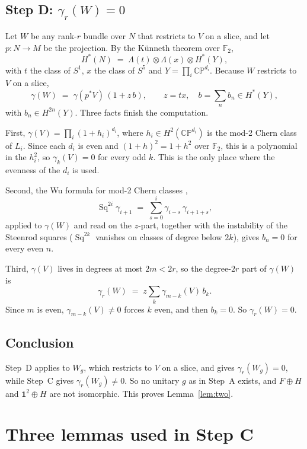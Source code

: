 \documentclass[11pt]{amsart}
\newcommand{\leanverified}[2]{\ignorespaces}
\theoremstyle{plain}
\theoremstyle{definition}
\newcommand{\F}{\mathbb F}
\newcommand{\CP}{\mathbb{CP}}
\newcommand{\Sq}{\operatorname{Sq}}
\begin{document}
\subsection{Step D: $\gamma_r(W) = 0$}

Let $W$ be any rank-$r$ bundle over $N$ that restricts to $V$ on a slice, and
let $p \colon N \to M$ be the projection.  By the K\"unneth theorem over
$\F_2$,
\[
  H^{*}(N) \;=\; \Lambda(t) \otimes \Lambda(x) \otimes H^{*}(Y),
\]
with $t$ the class of $S^1$, $x$ the class of $S^5$ and
$Y = \prod_i \CP^{d_i}$.  Because $W$ restricts to $V$ on a slice,
\[
  \gamma(W) \;=\; \gamma(p^{*}V)\,(1 + z\,b),
  \qquad z = t x,\quad b = \sum_n b_n \in H^{*}(Y),
\]
with $b_n \in H^{2n}(Y)$.  Three facts finish the computation.

First, $\gamma(V) = \prod_i (1+h_i)^{d_i}$, where $h_i \in H^2(\CP^{d_i})$ is
the mod-2 Chern class of $L_i$.  Since each $d_i$ is even and
$(1+h)^2 = 1 + h^2$ over $\F_2$, this is a polynomial in the $h_i^2$, so
$\gamma_k(V) = 0$ for every odd $k$.  This is the only place where the
evenness of the $d_i$ is used.

Second, the Wu formula for mod-2 Chern classes \cite{MS},
\[
  \Sq^{2i}\gamma_{i+1} \;=\; \sum_{s=0}^{i} \gamma_{i-s}\,\gamma_{i+1+s},
\]
applied to $\gamma(W)$ and read on the $z$-part, together with the
instability of the Steenrod squares ($\Sq^{2k}$ vanishes on classes of degree
below $2k$), gives $b_n = 0$ for every even $n$.

Third, $\gamma(V)$ lives in degrees at most $2m < 2r$, so the degree-$2r$
part of $\gamma(W)$ is
\[
  \gamma_r(W) \;=\; z \sum_{k} \gamma_{m-k}(V)\, b_k .
\]
Since $m$ is even, $\gamma_{m-k}(V) \neq 0$ forces $k$ even, and then
$b_k = 0$.  So $\gamma_r(W) = 0$.

\subsection{Conclusion}

Step~D applies to $W_g$, which restricts to $V$ on a slice, and gives
$\gamma_r(W_g) = 0$, while Step~C gives $\gamma_r(W_g) \neq 0$.  So no
unitary $g$ as in Step~A exists, and $F \oplus H$ and $\mathbf 1^2 \oplus H$
are not isomorphic.  This proves Lemma~\ref{lem:two}.
\leanverified{lem:two}{GroupApproximation.CharClass.lemmaTwo\_of\_stepC\_stepD}

\section{Three lemmas used in Step C}
\label{sec:stepc}
\end{document}
